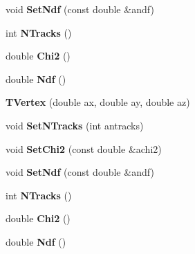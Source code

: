 \begin{CompactItemize}
\item 
void \textbf{Set\-Ndf} (const double \&andf)\label{classTVertex_a190c8dd6ca8e8789149d1556541c7b9}

\item 
int \textbf{NTracks} ()\label{classTVertex_06e89217c8f6756bdd2aaa3f0a870ed4}

\item 
double \textbf{Chi2} ()\label{classTVertex_dbedf19276ec1d01662c98c32742dfc2}

\item 
double \textbf{Ndf} ()\label{classTVertex_51885e0e598abdc758f44c85b2653ba2}

\item 
\textbf{TVertex} (double ax, double ay, double az)\label{classTVertex_68c048d3c4adf5db80da0a63167d920c}

\item 
void \textbf{Set\-NTracks} (int antracks)\label{classTVertex_6055513ece070c2367ef84e9d6eff498}

\item 
void \textbf{Set\-Chi2} (const double \&achi2)\label{classTVertex_030cf7d93fe6d871b0ac78fe751b29bd}

\item 
void \textbf{Set\-Ndf} (const double \&andf)\label{classTVertex_a190c8dd6ca8e8789149d1556541c7b9}

\item 
int \textbf{NTracks} ()\label{classTVertex_06e89217c8f6756bdd2aaa3f0a870ed4}

\item 
double \textbf{Chi2} ()\label{classTVertex_dbedf19276ec1d01662c98c32742dfc2}

\item 
double \textbf{Ndf} ()\label{classTVertex_51885e0e598abdc758f44c85b2653ba2}

\end{CompactItemize}
